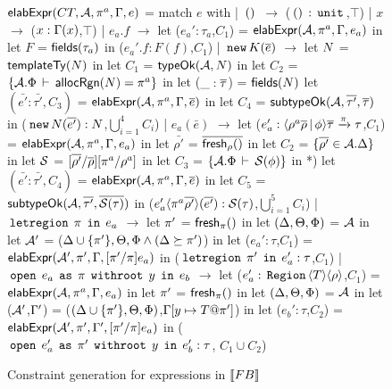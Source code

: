 \begin{figure}

\begin{codeml}
${\sf elabExpr}(CT, {\mathcal{A}}, \pi^a, \Gamma, e)$ = 
  match $e$ with
  | $\,{\tt ()}\,$ $\longrightarrow$ ($\,{\tt ()}\,:\,{\tt unit}\,$,$\top$)
  | $x$ $\longrightarrow$ ($x:\Gamma(x)$,$\top$)
  | $e_a.f$ $\longrightarrow$ 
    let ($e_a':\tau_a$,$C_1$) = ${\sf elabExpr}({\mathcal{A}},\pi^a,\Gamma,e_a)$ in
    let $F$ = ${\sf fields}(\tau_a)$ in
      ($e_a'.f:F(f)$,$C_1$)
  | $\,{\tt new}\, K(\overline{e})$ $\longrightarrow$ 
    let $N$ = ${\sf templateTy}(N)$ in
    let $C_1$ = ${\sf typeOk}({{\mathcal{A}}},{N})$ in
    let $C_2$ = $\{{\mathcal{A}}.\Phi\,\vdash\,{\sf allocRgn}(N)=\pi^a\}$ in
    let ($\_:\overline{\tau}$) = ${\sf fields}(N)$
    let $(\bar{e'}:\bar{\tau'}, C_3)$ = ${\sf elabExpr}({\mathcal{A}},\pi^a,\Gamma,\overline{e})$ in
    let $C_4$ = ${\sf subtypeOk}({{\mathcal{A}}},{\overline{\tau'}},{\overline{\tau}})$ in
      ($\,{\tt new}\, N(\overline{e'}) : N$,$\bigcup_{i=1}^4 C_i$)
  | $e_a(\bar{e})$ $\longrightarrow$ 
    let ($e_a':\langle \rho^a\overline{\rho}\,|\,\phi \rangle\overline{\tau} \xrightarrow{\pi} \tau$,$C_1$) = 
                ${\sf elabExpr}({\mathcal{A}},\pi^a,\Gamma,e_a)$ in
    let $\bar{\rho'}$ = $\overline{{\sf fresh}_\rho()}$ in
    let $C_2$ = $\{\overline{\rho'} \in {\mathcal{A}}.\Delta\}$ in
    let $\mathcal{S}$ = $[\overline{\rho'}/\overline{\rho}][\pi^a/\rho^a]$ in
    let $C_3$ = $\{{\mathcal{A}}.\Phi\,\vdash\,\mathcal{S}(\phi)\}$ in
*)   let $(\bar{e'}:\bar{\tau'}, C_4)$ = ${\sf elabExpr}({\mathcal{A}},\pi^a,\Gamma,\overline{e})$ in
    let $C_5$ = ${\sf subtypeOk}({{\mathcal{A}}},{\overline{\tau'}},{\overline{\mathcal{S}(\tau)}})$ in
      ($e_a'\langle \pi^a\overline{\rho'} \rangle(\overline{e'}):\mathcal{S}(\tau)$,$\bigcup_{i=1}^5 C_i$)
  | $\,{\tt letregion}\,\;\pi\;\,{\tt in}\,\;e_a$ $\longrightarrow$
    let $\pi'$ = ${\sf fresh}_{\pi}()$ in 
    let $(\Delta,\Theta,\Phi)$ = ${\mathcal{A}}$ in
    let ${\mathcal{A}}'$ = ($\Delta \cup \{\pi'\}, \Theta, \Phi \wedge (\Delta \succeq \pi')$) in
    let ($e_a':\tau$,$C_1$) = ${\sf elabExpr}({\mathcal{A}}',\pi',\Gamma,[\pi'/\pi]e_a)$ in
      ($\,{\tt letregion}\,\;\pi'\;\,{\tt in}\,\;e_a':\tau$,$C_1$)
  | $\,{\tt open}\,\;e_a\;\,{\tt as}\,\;\pi\;\,{\tt withroot}\,\;y\;\,{\tt in}\,\;e_b$ $\longrightarrow$ 
    let ($e_a':\,{\tt Region}\,\langle T \rangle\langle \rho \rangle$,$C_1$) = 
                ${\sf elabExpr}({\mathcal{A}},\pi^a,\Gamma,e_a)$ in
    let $\pi'$ = ${\sf fresh}_{\pi}()$ in 
    let $(\Delta,\Theta,\Phi)$ = ${\mathcal{A}}$ in
    let (${\mathcal{A}}'$,$\Gamma'$) = ($(\Delta \cup \{\pi'\},\Theta,\Phi)$,$\Gamma[y\mapsto T@\pi']$) in
    let ($e_b':\tau$,$C_2$) = ${\sf elabExpr}({\mathcal{A}}',\pi',\Gamma',[\pi'/\pi]e_a)$ in
      ($\,{\tt open}\,\;e_a'\;\,{\tt as}\,\;\pi'\;\,{\tt withroot}\,\;y\;\,{\tt in}\,\;e_b' : \tau$, $C_1 \cup C_2$)
\end{codeml}

\caption{Constraint generation for expressions in $\llbracket {\sc FB} \rrbracket$}
\label{fig:fb-elabexpr}
\end{figure}
